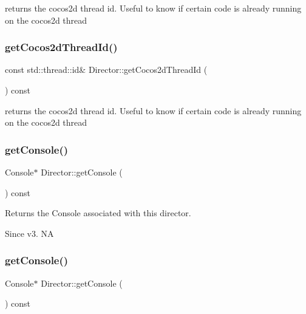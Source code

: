 returns the cocos2d thread id. Useful to know if certain code is already running on the cocos2d thread \mbox{\label{classDirector_a582225969ce1f42224c0387779f875e1}} 
\subsubsection{\texorpdfstring{get\+Cocos2d\+Thread\+Id()}{getCocos2dThreadId()}\hspace{0.1cm}{\footnotesize\ttfamily [2/2]}}
{\footnotesize\ttfamily const std\+::thread\+::id\& Director\+::get\+Cocos2d\+Thread\+Id (\begin{DoxyParamCaption}{ }\end{DoxyParamCaption}) const\hspace{0.3cm}{\ttfamily [inline]}}

returns the cocos2d thread id. Useful to know if certain code is already running on the cocos2d thread \mbox{\label{classDirector_a84f3750550158cbd24de5d7783852a12}} 
\subsubsection{\texorpdfstring{get\+Console()}{getConsole()}\hspace{0.1cm}{\footnotesize\ttfamily [1/2]}}
{\footnotesize\ttfamily Console$\ast$ Director\+::get\+Console (\begin{DoxyParamCaption}{ }\end{DoxyParamCaption}) const\hspace{0.3cm}{\ttfamily [inline]}}

Returns the Console associated with this director. \begin{DoxySince}{Since}
v3.  NA 
\end{DoxySince}
\mbox{\label{classDirector_a84f3750550158cbd24de5d7783852a12}} 
\subsubsection{\texorpdfstring{get\+Console()}{getConsole()}\hspace{0.1cm}{\footnotesize\ttfamily [2/2]}}
{\footnotesize\ttfamily Console$\ast$ Director\+::get\+Console (\begin{DoxyParamCaption}{ }\end{DoxyParamCaption}) const\hspace{0.3cm}{\ttfamily [inline]}}

